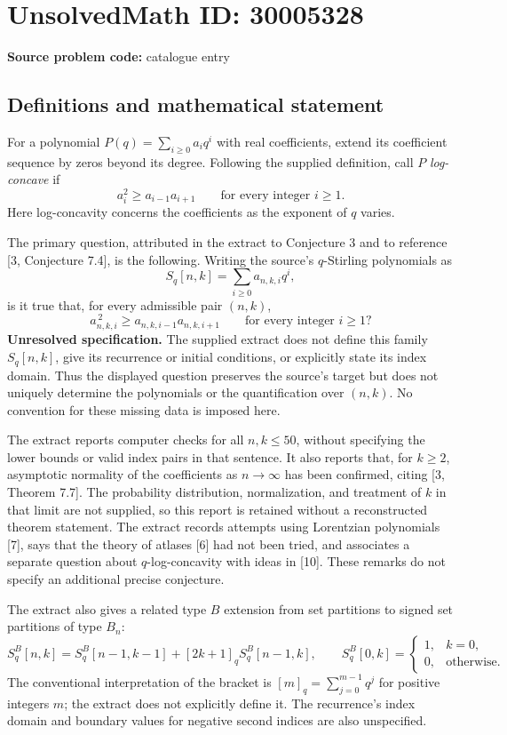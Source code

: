 \documentclass[11pt]{article}
\begin{document}
\section*{UnsolvedMath ID: 30005328}
\textbf{Source problem code:} catalogue entry
\subsection{Definitions and mathematical statement}
For a polynomial \(P(q)=\sum_{i\geq 0}a_iq^i\) with real coefficients, extend its coefficient sequence by zeros beyond its degree. Following the supplied definition, call \(P\) \emph{log-concave} if
\[
a_i^2\geq a_{i-1}a_{i+1}\qquad\text{for every integer }i\geq 1.
\]
Here log-concavity concerns the coefficients as the exponent of \(q\) varies.

The primary question, attributed in the extract to Conjecture 3 and to reference [3, Conjecture 7.4], is the following. Writing the source's \(q\)-Stirling polynomials as
\[
S_q[n,k]=\sum_{i\geq0}a_{n,k,i}q^i,
\]
is it true that, for every admissible pair \((n,k)\),
\[
a_{n,k,i}^{\,2}\geq a_{n,k,i-1}a_{n,k,i+1}
\qquad\text{for every integer }i\geq1?
\]
\textbf{Unresolved specification.} The supplied extract does not define this family \(S_q[n,k]\), give its recurrence or initial conditions, or explicitly state its index domain. Thus the displayed question preserves the source's target but does not uniquely determine the polynomials or the quantification over \((n,k)\). No convention for these missing data is imposed here.

The extract reports computer checks for all \(n,k\leq50\), without specifying the lower bounds or valid index pairs in that sentence. It also reports that, for \(k\geq2\), asymptotic normality of the coefficients as \(n\to\infty\) has been confirmed, citing [3, Theorem 7.7]. The probability distribution, normalization, and treatment of \(k\) in that limit are not supplied, so this report is retained without a reconstructed theorem statement. The extract records attempts using Lorentzian polynomials [7], says that the theory of atlases [6] had not been tried, and associates a separate question about \(q\)-log-concavity with ideas in [10]. These remarks do not specify an additional precise conjecture.

The extract also gives a related type \(B\) extension from set partitions to signed set partitions of type \(B_n\):
\[
S_q^B[n,k]=S_q^B[n-1,k-1]+[2k+1]_qS_q^B[n-1,k],
\qquad
S_q^B[0,k]=
\begin{cases}
1,&k=0,\\
0,&\text{otherwise}.
\end{cases}
\]
The conventional interpretation of the bracket is \([m]_q=\sum_{j=0}^{m-1}q^j\) for positive integers \(m\); the extract does not explicitly define it. The recurrence's index domain and boundary values for negative second indices are also unspecified.
\end{document}
